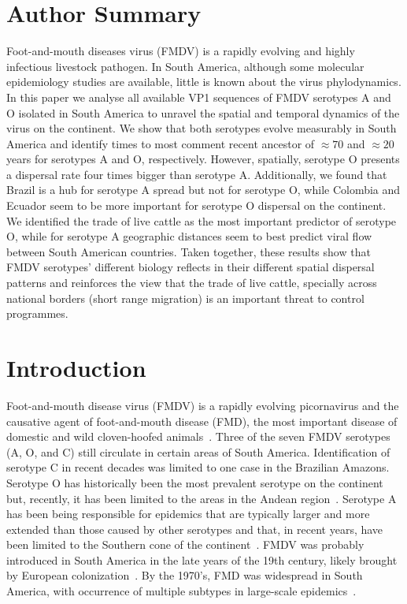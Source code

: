 \documentclass[10pt]{article}
\begin{document}
\section*{Author Summary} %
Foot-and-mouth diseases virus (FMDV) %
is a rapidly evolving and highly infectious livestock pathogen.
In South America, although some molecular epidemiology studies are available, little is known about the virus phylodynamics.
In this paper we analyse all available VP1 sequences of FMDV serotypes A and O isolated in South America to unravel the spatial and temporal dynamics of the virus on the continent.
We show that both serotypes evolve measurably in South America and identify times to most comment recent ancestor of $\approx 70$ and $\approx 20$ years for serotypes A and O, respectively. 
However, spatially, serotype O presents a dispersal rate four times bigger than serotype A.
Additionally, we found that Brazil is a hub for serotype A spread but not for serotype O, while Colombia and Ecuador seem to be more important for serotype O dispersal on the continent.
We identified the trade of live cattle as the most important predictor of serotype O, while for serotype A geographic distances seem to best predict viral flow between South American countries.
Taken together, these results show that FMDV serotypes' different biology reflects in their different spatial dispersal patterns and reinforces the view that the trade of live cattle, specially across national %
borders (short range migration) is an important threat to control programmes.   

\section*{Introduction}

Foot-and-mouth disease virus (FMDV) is a rapidly evolving picornavirus and the causative agent of foot-and-mouth disease (FMD), the most important disease of domestic and wild cloven-hoofed animals~\cite{review}.
Three of the seven FMDV serotypes (A, O, and C) still circulate in certain areas of South America.
Identification of serotype C in recent decades was limited to one case in the Brazilian Amazons.
Serotype O has historically been the most prevalent serotype on the continent but, recently, it has been limited to the areas in the Andean region~\cite{andean}.
Serotype A has been being responsible for epidemics that are typically larger and more extended than those caused by other serotypes and that, in recent years, have been limited to the Southern cone of the continent~\cite{Perez2001,Malirat2012}.
FMDV was probably introduced in South America in the late years of the 19th century, likely brought by European colonization~\cite{tully}. 
By the 1970's, FMD was widespread in South America, with occurrence of multiple subtypes in large-scale epidemics~\cite{Saraiva2003}.
\end{document}
